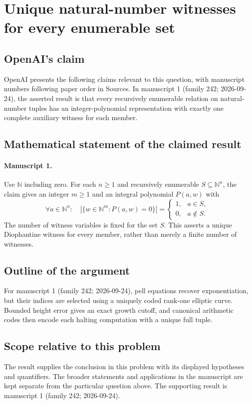 \documentclass[11pt]{article}
\begin{document}
\section*{Unique natural-number witnesses for every enumerable set}

\subsection{OpenAI's claim}
OpenAI presents the following claims relevant to this question, with manuscript numbers following paper order in Sources. In manuscript 1 (family 242; 2026-09-24), the asserted result is that every recursively enumerable relation on natural-number tuples has an integer-polynomial representation with exactly one complete auxiliary witness for each member.

\subsection{Mathematical statement of the claimed result}
\paragraph{Manuscript 1.}
Use $\mathbb N$ including zero. For each $n\ge1$ and recursively enumerable $S\subseteq\mathbb N^n$, the claim gives an integer $m\ge1$ and an integral polynomial $P(a,w)$ with
\[
 \forall a\in\mathbb N^n:\quad
 |\{w\in\mathbb N^m:P(a,w)=0\}|=
 \begin{cases}1,&a\in S,\\0,&a\notin S.\end{cases}
\]
The number of witness variables is fixed for the set $S$. This asserts a unique Diophantine witness for every member, rather than merely a finite number of witnesses.

\subsection{Outline of the argument}
For manuscript 1 (family 242; 2026-09-24), pell equations recover exponentiation, but their indices are selected using a uniquely coded rank-one elliptic curve. Bounded height error gives an exact growth cutoff, and canonical arithmetic codes then encode each halting computation with a unique full tuple.

\subsection{Scope relative to this problem}
The result supplies the conclusion in this problem with its displayed hypotheses and quantifiers. The broader statements and applications in the manuscript are kept separate from the particular question above. The supporting result is manuscript 1 (family 242; 2026-09-24).
\end{document}
